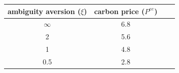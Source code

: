 \begin{tabular}{cccc}
\hline
 ambiguity aversion ($\xi$) &  carbon price ($P^{ee}$)\\
\hline
 $\infty$ & 6.8  \\
  2        & 5.6 \\
  1        & 4.8 \\
  0.5        & 2.8 \\
\hline
\end{tabular}